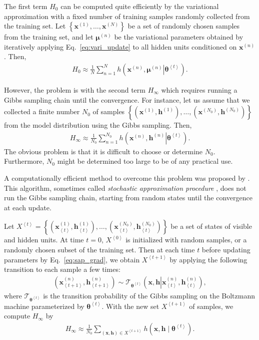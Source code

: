 \documentclass[dissertation,nocontribution,draft*]{aaltoseries}
\newcommand{\qt}[1]{\left<#1\right>}
\newcommand{\vect}[1]{\mathbf{#1}}
\newcommand{\vects}[1]{\boldsymbol{#1}}
\newcommand{\vh}[0]{\vect{h}}
\newcommand{\vx}[0]{\vect{x}}
\newcommand{\vmu}[0]{\vects{\mu}}
\newcommand{\TT}[0]{{\vects{\theta}}}
\newcommand{\T}[0]{\mathcal{T}}
\begin{document}
The first term $H_0$ can be computed quite efficiently by
the variational approximation with a fixed number of
training samples randomly collected from the training set.
Let $\left\{ \vx^{(1)}, \dots, \vx^{(N)} \right\}$ be a
set  of randomly chosen samples from the training set, and
let $\vmu^{(n)}$ be the variational parameters obtained by
iteratively applying Eq.~\eqref{eq:vari_update} to all
hidden units conditioned on $\vx^{(n)}$. Then, 
\begin{align*}
    H_0 \approx \frac{1}{N}\sum_{n=1}^{N} h\left(\left.\vx^{(n)}, \vmu^{(n)}
    \right| \TT^{\qt{t}}\right).
\end{align*}

However, the problem is with the second term $H_\infty$
which
requires running a Gibbs sampling chain until the
convergence. For instance, let us assume that we collected a
finite number $N_0$ of samples $\left\{ (\vx^{(1)},
\vh^{(1)}), \dots, (\vx^{(N_0)}, \vh^{(N_0)}) \right\}$ from
the model distribution using the Gibbs sampling. Then, 
\begin{align*}
    H_\infty \approx \frac{1}{N_0} \sum_{n=1}^{N_0}
    h\left(\left.\vx^{(n)}, \vh^{(n)} \right| \TT^{\qt{t}}\right).
\end{align*}
The obvious problem is that it is difficult to choose or
determine $N_0$. Furthermore, $N_0$ might be determined too
large to be of any practical use.

A computationally efficient method to overcome this problem
was proposed by \citet{Younes1988}. This algorithm, sometimes
called \textit{stochastic approximation procedure}
\citep{Salakhutdinov2009}, does not run the Gibbs
sampling chain, starting from random states until the
convergence at each update.

Let $X^{\qt{t}} = \left\{ \left(\vx_{\qt{t}}^{(1)},
\vh_{\qt{t}}^{(1)}\right),
\dots, \left(\vx_{\qt{t}}^{(N_0)}, \vh_{\qt{t}}^{(N_0)}\right)\right\}$ be
a set of states of visible and hidden units. At time $t=0$,
$X^{\qt{0}}$ is initialized with random samples, or a randomly
chosen subset of the training set. Then at each time $t$ 
before updating parameters by
Eq.~\eqref{eq:sap_grad}, we obtain
$X^{\qt{t+1}}$ by applying the following transition to each
sample a few times:
\begin{align*}
    \left( \vx_{\qt{t+1}}^{(n)}, \vh_{\qt{t+1}}^{(n)}\right) \sim
    \T_{\TT^{\qt{t}}} \left(\vx, \vh \left| \vx_{\qt{t}}^{(n)},
    \vh_{\qt{t}}^{(n)}\right.\right),
\end{align*}
where $\T_{\TT^{\qt{t}}}$ is the transition probability of the
Gibbs sampling on the Boltzmann machine parameterized by
$\TT^{\qt{t}}$. With the new set $X^{\qt{t+1}}$ of samples, we compute
$H_\infty$ by
\begin{align*}
    H_\infty \approx \frac{1}{N_0} \sum_{(\vx, \vh) \in
    X^{\qt{t+1}}}
    h\left(\vx, \vh \mid \TT^{\qt{t}}\right).
\end{align*}
\end{document}
